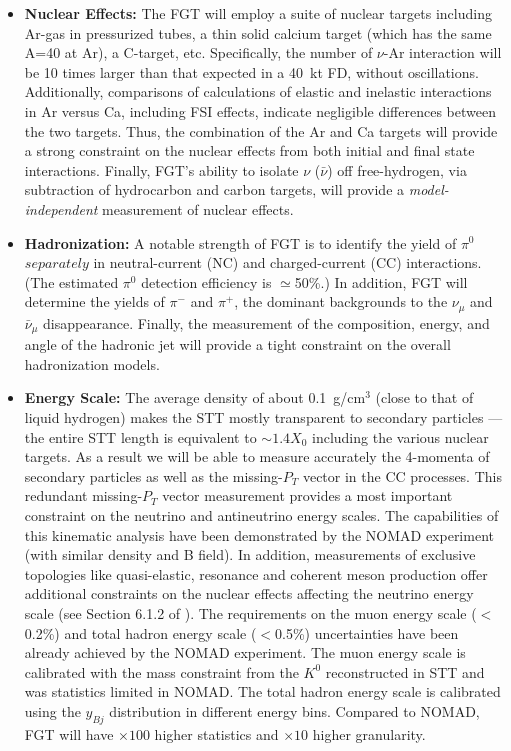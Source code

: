 \begin{itemize}
    \item {\bf Nuclear Effects:} The FGT will employ a suite of
      nuclear targets including Ar-gas in pressurized tubes, a thin
      solid calcium target (which has the same A=40 at Ar), a
      C-target, etc.  Specifically, the number of $\nu$-Ar interaction
      will be 10 times larger than that expected in a 40~kt FD,
      without oscillations. Additionally, comparisons of calculations
      of elastic and inelastic interactions in Ar versus Ca, including
      FSI effects, indicate negligible differences between the two
      targets. Thus, the combination of the Ar and Ca targets will
      provide a strong constraint on the nuclear effects from both
      initial and final state interactions.  Finally, FGT's ability to
      isolate $\nu$ ($\bar\nu$) off free-hydrogen, via subtraction of
      hydrocarbon and carbon targets, will provide a 
      {\em model-independent} measurement of nuclear effects.

    \item {\bf Hadronization:} A notable strength of FGT is to
      identify the yield of $\pi^0$ $separately$ in neutral-current
      (NC) and charged-current (CC) interactions. (The estimated
      $\pi^0$ detection efficiency is $\simeq$50\%.) In addition, FGT
      will determine the yields of $\pi^-$ and $\pi^+$, the dominant
      backgrounds to the $\nu_\mu$ and $\bar\nu_\mu$
      disappearance. Finally, the measurement of the composition,
      energy, and angle of the hadronic jet will provide a tight
      constraint on the overall hadronization models.

    \item {\bf Energy Scale:} The average density of about
      0.1~g/cm$^3$ (close to that of liquid hydrogen) makes the STT
      mostly transparent to secondary particles --- the entire STT
      length is equivalent to $\sim 1.4 X_0$ including the various
      nuclear targets. As a result we will be able to measure
      accurately the 4-momenta of secondary particles as well as the
      missing-$P_T$ vector in the CC processes.  This redundant
      missing-$P_T$ vector measurement provides a most important
      constraint on the neutrino and antineutrino energy scales. The
      capabilities of this kinematic analysis have been demonstrated
      by the NOMAD experiment (with similar density and B field).  In
      addition, measurements of exclusive topologies like
      quasi-elastic, resonance and coherent meson production offer
      additional constraints on the nuclear effects affecting the
      neutrino energy scale (see Section 6.1.2 of \volphys).  %
The requirements on the muon energy scale
      ($<$0.2\%) and total hadron energy scale ($<$0.5\%)
      uncertainties have been already achieved by the NOMAD
      experiment. The muon energy scale is calibrated with the mass
      constraint from the $K^0$ reconstructed in STT and was
      statistics limited in NOMAD. The total hadron energy scale is
      calibrated using the $y_{Bj}$ distribution in different energy
      bins. Compared to NOMAD, FGT will have $\times 100$ higher
      statistics and $\times 10$ higher granularity.
\end{itemize}

